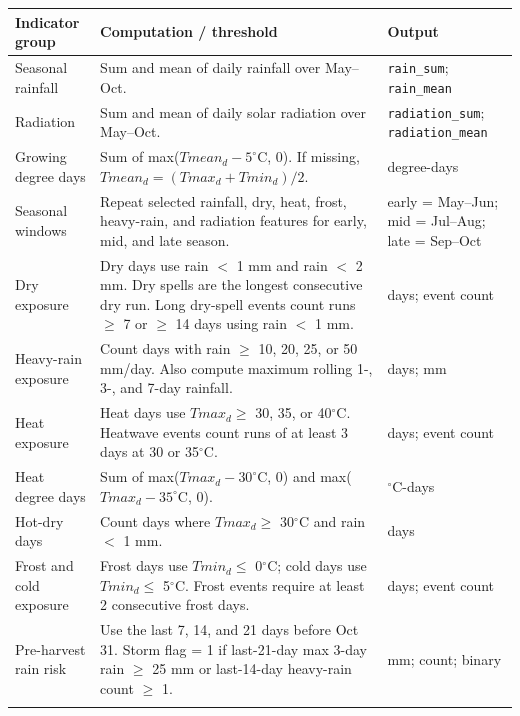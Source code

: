 \begingroup
{}
\begin{tabularx}{\textwidth}{p{}Yp{0.24\textwidth}}
\toprule
Indicator group & Computation / threshold & Output \\
\midrule
{}
Seasonal rainfall & Sum and mean of daily rainfall over May--Oct. & \texttt{rain\_sum}; \texttt{rain\_mean} \\
\hline
Radiation & Sum and mean of daily solar radiation over May--Oct. & \texttt{radiation\_sum}; \texttt{radiation\_mean} \\
\hline
Growing degree days & Sum of max($Tmean_d - 5^\circ$C, 0). If missing, $Tmean_d=(Tmax_d+Tmin_d)/2$. & degree-days \\
\hline
Seasonal windows & Repeat selected rainfall, dry, heat, frost, heavy-rain, and radiation features for early, mid, and late season. & early = May--Jun; mid = Jul--Aug; late = Sep--Oct \\
\hline
Dry exposure & Dry days use rain $<$ 1 mm and rain $<$ 2 mm. Dry spells are the longest consecutive dry run. Long dry-spell events count runs $\geq$ 7 or $\geq$ 14 days using rain $<$ 1 mm. & days; event count \\
\hline
Heavy-rain exposure & Count days with rain $\geq$ 10, 20, 25, or 50 mm/day. Also compute maximum rolling 1-, 3-, and 7-day rainfall. & days; mm \\
\hline
Heat exposure & Heat days use $Tmax_d \geq$ 30, 35, or 40$^\circ$C. Heatwave events count runs of at least 3 days at 30 or 35$^\circ$C. & days; event count \\
\hline
Heat degree days & Sum of max($Tmax_d - 30^\circ$C, 0) and max($Tmax_d - 35^\circ$C, 0). & $^\circ$C-days \\
\hline
Hot-dry days & Count days where $Tmax_d \geq$ 30$^\circ$C and rain $<$ 1 mm. & days \\
\hline
Frost and cold exposure & Frost days use $Tmin_d \leq$ 0$^\circ$C; cold days use $Tmin_d \leq$ 5$^\circ$C. Frost events require at least 2 consecutive frost days. & days; event count \\
\hline
Pre-harvest rain risk & Use the last 7, 14, and 21 days before Oct 31. Storm flag = 1 if last-21-day max 3-day rain $\geq$ 25 mm or last-14-day heavy-rain count $\geq$ 1. & mm; count; binary \\
\bottomrule
\end{tabularx}
\endgroup
